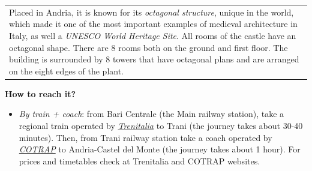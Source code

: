 \documentclass[
	openany, %
	parskip=full, %
	12pt, %
	a4paper, %
]{conferencebooklet} %
\newcommand\smallbull{\scaleobj{0.7}{\blacksquare}}
\newcommand\itema{\item[\textcolor{case_blue}{$\smallbull$}]}
\begin{document}
\begin{adjustwidth}{8pt}{12pt}
\begin{table}[h!]
{\begin{tabular}{p{90mm}}
            \vspace{1mm}
            Placed in Andria, it is known for its \textit{octagonal structure}, unique in the world, which made it one of the most important examples of medieval architecture in Italy, as well a \textit{UNESCO World Heritage Site}.
            All rooms of the castle have an octagonal shape. There are 8 rooms both on the ground and first floor. The building is surrounded by 8 towers that have octagonal plans and are arranged on the eight edges of the plant.
            \end{tabular}
            }
\end{table}
\vspace{-3mm}
\textbf{How to reach it?}
\vspace{-5mm}
\begin{itemize}[leftmargin=*, noitemsep]
    \itema \textit{By train + coach}: from Bari Centrale (the Main railway station), take a regional train operated by \color{blue}\href{https://www.trenitalia.com/en.html}{\textit{Trenitalia}} \color{black} to Trani (the journey takes about 30-40 minutes). Then, from Trani railway station take a coach operated by \color{blue}\href{https://biglietteria.cotrap.it/#/ricerca}{\textit{COTRAP}} \color{black} to Andria-Castel del Monte (the journey takes about 1 hour). For prices and timetables check at Trenitalia and COTRAP websites.
\end{itemize}
\end{adjustwidth}
\end{document}
